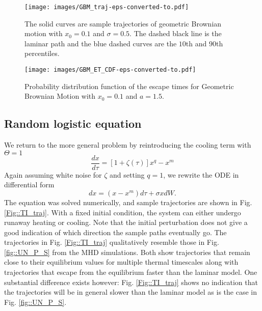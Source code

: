 \documentclass[useAMS]{mn2e}
\begin{document}
\begin{figure}
\texttt{[image: images/GBM\_traj-eps-converted-to.pdf]}
\caption{ The solid curves are sample trajectories of geometric Brownian motion with $x_{0}=0.1$ and $\sigma=0.5$. The dashed black line is the laminar path and the blue dashed curves are the $10$th and $90$th percentiles.}
\label{Fig::GBM_Traj}
\end{figure}


\begin{figure}
\texttt{[image: images/GBM\_ET\_CDF-eps-converted-to.pdf]}
\caption{Probability distribution function of the escape times for
  Geometric Brownian Motion with $x_{0}=0.1$ and $a=1.5$.}
\label{Fig::GBM_ET}
\end{figure}





\subsection{Random logistic equation}

 
We return to the more general problem by reintroducing the cooling
 term with $\Theta=1$
\begin{equation}
\frac{dx}{d\tau}=\left[1+\zeta(\tau)\right]x^q-x^{m}
\label{eqn::M2dfg}
\end{equation}
Again assuming white noise for $\zeta$ and setting $q=1$, 
we rewrite the ODE in differential form 
\begin{equation}
dx=\left(x- x^{m}\right)d\tau+\sigma x dW.
\end{equation}
The equation was solved numerically, and sample trajectories are shown in
Fig. \ref{Fig::TI_traj}. With a fixed initial condition, the system can either
undergo runaway heating or cooling. Note that the initial perturbation does
not give a good indication of which direction the sample paths
eventually go. The trajectories in
Fig. \ref{Fig::TI_traj} qualitatively resemble those in Fig.
\ref{fig::UN_P_S} from the MHD simulations. Both show trajectories
that remain close to their equilibrium values for multiple thermal
timescales along with trajectories that escape from the equilibrium
faster than the laminar model. One substantial difference exists
however: Fig. \ref{Fig::TI_traj} shows no indication that the
trajectories will be in general slower than the laminar model as  
is the case in Fig. \ref{fig::UN_P_S}. 
\end{document}
